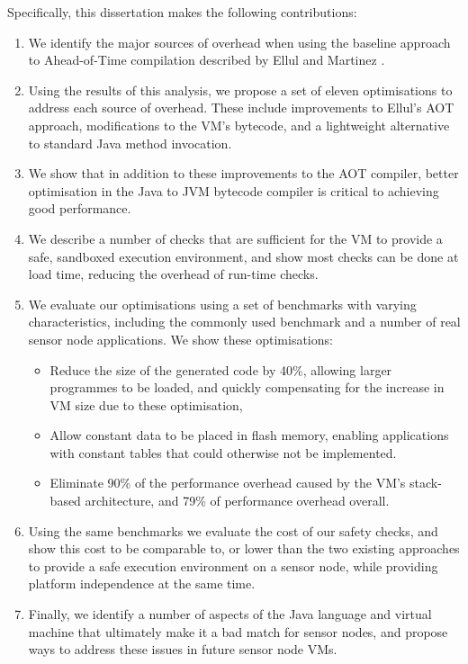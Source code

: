 \noindent
Specifically, this dissertation makes the following contributions:
\begin{enumerate}
    \item We identify the major sources of overhead when using the baseline approach to Ahead-of-Time compilation described by Ellul and Martinez \cite{Ellul:2010iw, Ellul:2012thesis}.
    \item Using the results of this analysis, we propose a set of eleven optimisations to address each source of overhead. These include improvements to Ellul's AOT approach, modifications to the VM's bytecode, and a lightweight alternative to standard Java method invocation.    
    \item We show that in addition to these improvements to the AOT compiler, better optimisation in the Java to JVM bytecode compiler is critical to achieving good performance.
    \item We describe a number of checks that are sufficient for the VM to provide a safe, sandboxed execution environment, and show most checks can be done at load time, reducing the overhead of run-time checks.
    \item We evaluate our optimisations using a set of benchmarks with varying characteristics, including the commonly used  benchmark \cite{coremark} and a number of real sensor node applications. We show these optimisations:
    \begin{itemize}
    	\item Reduce the size of the generated code by 40\%, allowing larger programmes to be loaded, and quickly compensating for the increase in VM size due to these optimisation, 
    	\item Allow constant data to be placed in flash memory, enabling applications with constant tables that could otherwise not be implemented.
    	\item Eliminate 90\% of the performance overhead caused by the VM's stack-based architecture, and 79\% of performance overhead overall.
    \end{itemize}
    \item Using the same benchmarks we evaluate the cost of our safety checks, and show this cost to be comparable to, or lower than the two existing approaches to provide a safe execution environment on a sensor node, while providing platform independence at the same time.
    \item Finally, we identify a number of aspects of the Java language and virtual machine that ultimately make it a bad match for sensor nodes, and propose ways to address these issues in future sensor node VMs.
\end{enumerate}

